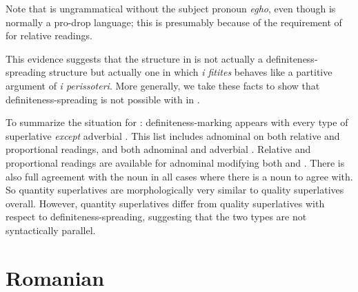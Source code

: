 \documentclass[output=paper
,modfonts
,nonflat]{langsci/langscibook}
\begin{document}
\z

\z 

Note that  is ungrammatical without the subject pronoun \textit{egho}, even though  is normally a pro-drop language; this is presumably because of the requirement of  for relative readings.

This evidence  suggests that the structure in  is not actually a definiteness-spreading structure but actually one in which \textit{i fitites} behaves like a partitive argument of \textit{i perissoteri}.  More generally, we take these facts to show that definiteness-spreading is not possible with  in .

To summarize the situation for : definiteness-marking appears with every type of superlative \textit{except} adverbial . This list includes adnominal  on both relative and proportional readings, and both adnominal and adverbial . Relative and proportional readings are available for adnominal  modifying both  and . There is also full agreement with the noun in all cases where there is a noun to agree with. So quantity superlatives are morphologically very similar to quality superlatives overall. However, quantity superlatives differ from quality superlatives with respect to definiteness-spreading, suggesting that the two types are not syntactically parallel. 


\section{Romanian} \label{sec:coppockstrand:3}
\end{document}
